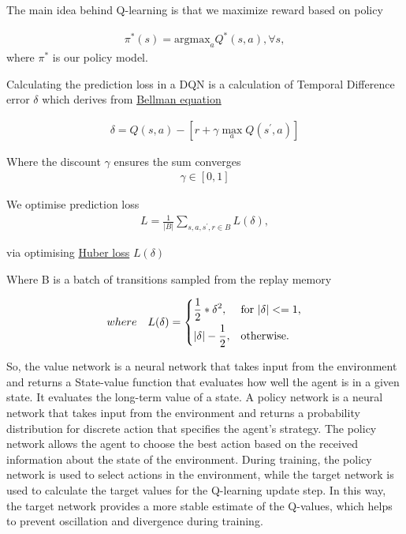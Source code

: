 \documentclass{article}
\begin{document}
The main idea behind Q-learning is that we maximize reward based on policy 

\begin{align}
\pi^*(s)  = \text{argmax}_a Q^*(s,a), \forall s,
\end{align}
where $\pi^*$ is our policy model. 

Calculating the prediction loss in a DQN is a calculation of Temporal Difference error $\delta$ which derives from \href{https://towardsdatascience.com/how-does-a-dqn-approximate-bellmans-equation-53e591d5e33}{Bellman equation}


\begin{align}
\delta = Q(s, a) - [r + \gamma \max_a{Q(s^{'}, a)}] \nonumber
\end{align}

Where the discount $\gamma$  ensures the sum converges
\begin{align}
\gamma \in[0, 1] \nonumber
\end{align}

We optimise prediction loss
\begin{align}
L = \frac{1}{\left|B\right|} \sum_{s,a,s^{'},r\in B}{L(\delta)},
\end{align}

via optimising \href{https://en.wikipedia.org/wiki/Huber_loss}{Huber loss} $L(\delta)$

Where B is a batch of transitions sampled from the replay memory

\begin{align}
where \quad L(\delta) = \begin{dcases*}
    \frac{1}{2}*\delta^2, & for $ |\delta| <= 1 $,\\
    |\delta|-\frac{1}{2}, & otherwise. 
    \end{dcases*} \nonumber 
\end{align}

So, the value network is a neural network that takes input from the environment and returns a State-value function that evaluates how well the agent is in a given state. It evaluates the long-term value of a state.
A policy network is a neural network that takes input from the environment and returns a probability distribution for discrete action that specifies the agent's strategy. The policy network allows the agent to choose the best action based on the received information about the state of the environment.
During training, the policy network is used to select actions in the environment, while the target network is used to calculate the target values for the Q-learning update step. In this way, the target network provides a more stable estimate of the Q-values, which helps to prevent oscillation and divergence during training.
\end{document}
